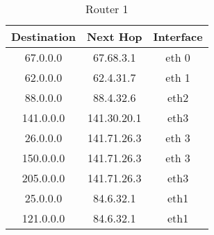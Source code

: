 \documentclass{scrartcl}
\begin{document}
\begin{table}[h]
\centering
\caption{Router 1}
\label{Router 1}
\begin{tabular}{ccc}
\hline
\multicolumn{1}{|c|}{\textbf{Destination}} & \multicolumn{1}{c|}{\textbf{Next Hop}} & \multicolumn{1}{c|}{\textbf{Interface}} \\ \hline
67.0.0.0                                   & 67.68.3.1                              & eth 0                                   \\
62.0.0.0                                   & 62.4.31.7                              & eth 1                                   \\
88.0.0.0                                   & 88.4.32.6                              & eth2                                    \\
141.0.0.0                                  & 141.30.20.1                            & eth3                                    \\
26.0.0.0                                   & 141.71.26.3                            & eth 3                                   \\
150.0.0.0                                  & 141.71.26.3                            & eth 3                                   \\
205.0.0.0                                  & 141.71.26.3                            & eth3                                    \\
25.0.0.0                                   & 84.6.32.1                              & eth1                                    \\
121.0.0.0                                  & 84.6.32.1                              & eth1                                   
\end{tabular}
\end{table}
\end{document}
